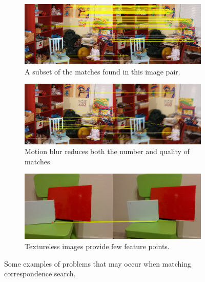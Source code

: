 \begin{figure}[h]
	\centering
	\begin{subfigure}{\textwidth}
		\centering
		\includegraphics[width=\textwidth]{img/good_stereo}
		\caption{A subset of the matches found in this image pair.}\label{fig:good_stereo}
	\end{subfigure}
	\begin{subfigure}{\textwidth}
		\centering
		\includegraphics[width=\textwidth]{img/motion_blur}
		\caption{Motion blur reduces both the number and quality of matches.}\label{fig:motion_blur}
	\end{subfigure}
	\begin{subfigure}{\textwidth}
		\centering
		\includegraphics[width=\textwidth]{img/textureless_stereo}
		\caption{Textureless images provide few feature points.}\label{fig:textureless}
	\end{subfigure}
	\caption{Some examples of problems that may occur when matching correspondence search.}\label{fig:matching_problems}
\end{figure}


